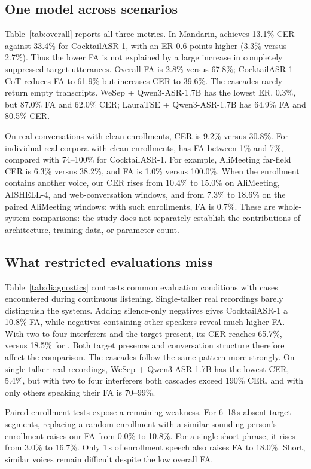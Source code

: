 \subsection{One model across scenarios}
Table~\ref{tab:overall} reports all three metrics.
In Mandarin, \model achieves 13.1\% CER against 33.4\% for CocktailASR-1, with an ER 0.6 points higher (3.3\% versus 2.7\%).
Thus the lower FA is not explained by a large increase in completely suppressed target utterances.
Overall FA is 2.8\% versus 67.8\%; CocktailASR-1-CoT reduces FA to 61.9\% but increases CER to 39.6\%.
The cascades rarely return empty transcripts.
WeSep + Qwen3-ASR-1.7B has the lowest ER, 0.3\%, but 87.0\% FA and 62.0\% CER; LauraTSE + Qwen3-ASR-1.7B has 64.9\% FA and 80.5\% CER.

On real conversations with clean enrollments, CER is 9.2\% versus 30.8\%.
For individual real corpora with clean enrollments, \model has FA between 1\% and 7\%, compared with 74--100\% for CocktailASR-1.
For example, AliMeeting far-field CER is 6.3\% versus 38.2\%, and FA is 1.0\% versus 100.0\%.
When the enrollment contains another voice, our CER rises from 10.4\% to 15.0\% on AliMeeting, AISHELL-4, and web-conversation windows, and from 7.3\% to 18.6\% on the paired AliMeeting windows; with such enrollments, FA is 0.7\%.
These are whole-system comparisons: the study does not separately establish the contributions of architecture, training data, or parameter count.

\subsection{What restricted evaluations miss}
Table~\ref{tab:diagnostics} contrasts common evaluation conditions with cases encountered during continuous listening.
Single-talker real recordings barely distinguish the systems.
Adding silence-only negatives gives CocktailASR-1 a 10.8\% FA, while negatives containing other speakers reveal much higher FA.
With two to four interferers and the target present, its CER reaches 65.7\%, versus 18.5\% for \model.
Both target presence and conversation structure therefore affect the comparison.
The cascades follow the same pattern more strongly.
On single-talker real recordings, WeSep + Qwen3-ASR-1.7B has the lowest CER, 5.4\%, but with two to four interferers both cascades exceed 190\% CER, and with only others speaking their FA is 70--99\%.

Paired enrollment tests expose a remaining weakness.
For 6--18\,s absent-target segments, replacing a random enrollment with a similar-sounding person's enrollment raises our FA from 0.0\% to 10.8\%.
For a single short phrase, it rises from 3.0\% to 16.7\%.
Only 1\,s of enrollment speech also raises FA to 18.0\%.
Short, similar voices remain difficult despite the low overall FA.

